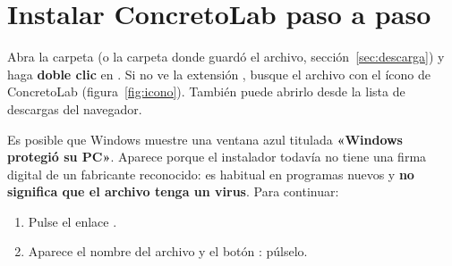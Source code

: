 \section{Instalar ConcretoLab paso a paso}


Abra la carpeta  (o la carpeta donde guardó el archivo, sección~\ref{sec:descarga}) y haga
\textbf{doble clic} en \ruta{\archivoinstalador}. Si no ve la extensión , busque el archivo con el ícono
de ConcretoLab (figura~\ref{fig:icono}). También puede abrirlo desde la lista de descargas del navegador.

\label{sec:smartscreen}

Es posible que Windows muestre una ventana azul titulada \textbf{«Windows protegió su PC»}. Aparece porque el
instalador todavía no tiene una firma digital de un fabricante reconocido: es habitual en programas nuevos y
\textbf{no significa que el archivo tenga un virus}. Para continuar:

\begin{enumerate}
	\item Pulse el enlace .
	\item Aparece el nombre del archivo y el botón : púlselo.
\end{enumerate}

